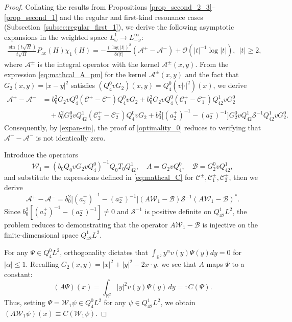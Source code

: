 \documentclass[reqno]{amsart}
\numberwithin{equation}{section}
\begin{document}
\begin{proof}  
	Collating the results from Propositions \ref{prop_second_2_3}--\ref{prop_second_1} and the regular and first-kind resonance cases (Subsection~\ref{subsec:regular_first_1}),    we derive   the  following  asymptotic expansions  in the weighted space $L^1_\omega \to L^\infty_{-\omega}:$
	\begin{align}\label{expan-sin}
	\frac{\sin(t\sqrt{H})}{t\sqrt{H}} P_{\mathrm{ac}}(H)\chi_1(H)  
	= -\frac{(\log|t|)^2}{8i|t|}(\mathcal{A}^+ - \mathcal{A}^-) + \mathcal{O}\!\left(|t|^{-1}\log |t|\right),\ \ |t|\ge 2,
	\end{align}
	where $\mathcal{A}^\pm$ is the integral operator with the kernel $\mathcal{A}^\pm(x,y).$ 
	From the expression \eqref{eq:mathcal_A_pm} for the kernel $\mathcal{A}^\pm(x,y)$ and the fact that $G_2(x,y)=|x-y|^2$ satisfies $(Q_4^0 v G_2)(x,y) = Q_4^0(v|\cdot|^2)(x)$,  we derive 
	\[
	\begin{aligned}
		\mathcal{A}^+ - \mathcal{A}^- &= b_0^2 G_2 v Q_4^0(\mathcal{C}^+-\mathcal{C}^-) Q_4^0 v G_2
		+ b_0^2 G_2 v Q_4^0(\mathcal{C}_1^+-\mathcal{C}_1^-) Q_{42}^1 v G_2^0 \\  
		&\quad + b_0^2 G_2^0 v Q_{42}^1 (\mathcal{C}_2^+-\mathcal{C}_2^-) Q_4^0 v G_2  
		+ b_0^2\bigl[(a_2^+)^{-1}-(a_2^-)^{-1}\bigr] G_2^0 v Q_{42}^1 \mathcal{S}^{-1} Q_{42}^1 v G_2^0.  
	\end{aligned}
	\]  
	Consequently, by  \eqref{expan-sin}, the proof of \eqref{optimality_0} reduces to verifying that $\mathcal{A}^+ - \mathcal{A}^-$ is not identically zero.

Introduce the operators  
\[  
\mathcal{W}_1 = (b_0 Q_0 v G_2 v Q_4^0)^{-1} Q_0 T_0 Q_{42}^1, \quad  
A = G_2 v Q_4^0, \quad  
\mathcal{B} = G_2^0 v Q_{42}^1,  
\]  
and substitute the expressions defined in \eqref{eq:mathcal_C} for $\mathcal{C}^\pm, \mathcal{C}_1^\pm, \mathcal{C}_2^\pm$, then we derive
\[  
\mathcal{A}^+ - \mathcal{A}^- = b_0^2 \bigl[(a_2^+)^{-1} - (a_2^-)^{-1}\bigr] (A \mathcal{W}_1 - \mathcal{B}) \mathcal{S}^{-1} (A \mathcal{W}_1 -\mathcal{B})^*.  
\]  
Since $b_0^2[(a_2^+)^{-1} - (a_2^-)^{-1}] \neq 0$ and $\mathcal{S}^{-1}$ is positive definite on $Q_{42}^1 L^2$, the problem reduces to demonstrating that the operator $A\mathcal{W}_1 - \mathcal{B}$ is injective on the finite-dimensional space $Q_{42}^1 L^2$.  
	
	For any $\Psi \in Q_4^0 L^2$, orthogonality dictates that $\int_{\mathbb{R}^2} y^\alpha v(y) \Psi(y)  dy = 0$ for $|\alpha| \le 1$. Recalling $G_2(x,y) = |x|^2 + |y|^2 - 2x \cdot y$, we see that $A$ maps $\Psi$ to a constant:  
	$$  
	(A \Psi)(x) = \int_{\mathbb{R}^2} |y|^2 v(y) \Psi(y) \, dy =: C(\Psi).  
	$$  
	Thus, setting $\Psi = \mathcal{W}_1 \psi \in Q_4^0 L^2$ for any $\psi \in Q_{42}^1 L^2$, we obtain $(A \mathcal{W}_1 \psi)(x) \equiv C(\mathcal{W}_1 \psi)$.  
	

\end{proof}
\end{document}
